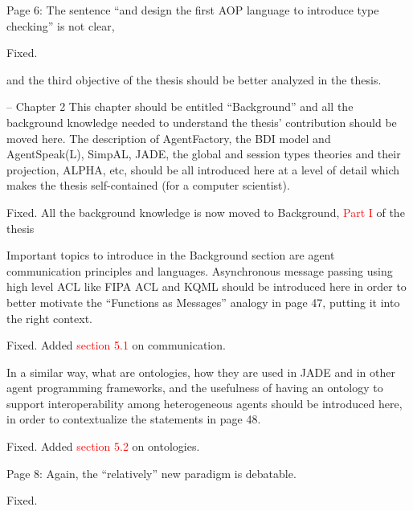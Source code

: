 \documentclass{article}
\newcommand*\R[1]{\textcolor{red}{#1}} %
\newcommand{\todo}[1]{[\textcolor{green}{TODO}: #1]}
\newenvironment{them}{\noindent\begingroup\color{blue}}{\endgroup\par}
\begin{document}
\begin{them}

Page 6:
The sentence ``and design the first AOP language to introduce type checking'' is
not clear,

\end{them}
Fixed.

\begin{them}

and the third objective of the thesis should be better analyzed in
the thesis.

\end{them}
\todo{} 

\begin{them}

-- Chapter 2
This chapter should be entitled ``Background'' and all the background knowledge
needed to understand the thesis' contribution should be moved here. The
description of AgentFactory, the BDI model and AgentSpeak(L), SimpAL, JADE, the
global and session types theories and their projection, ALPHA, etc, should be
all introduced here at a level of detail which makes the thesis self-contained
(for a computer scientist).

\end{them}
Fixed. All the background knowledge is now moved to Background, \R{Part I} of
the thesis

\begin{them}

Important topics to introduce in the Background section are agent communication
principles and languages. Asynchronous message passing using high level ACL
like FIPA ACL and KQML should be introduced here in order to better motivate
the ``Functions as Messages'' analogy in page 47, putting it into the right
context.

\end{them}
Fixed. Added \R{section 5.1} on communication.

\begin{them}

In a similar way, what are ontologies, how they are used in JADE and in other
agent programming frameworks, and the usefulness of having an ontology to
support interoperability among heterogeneous agents should be introduced here,
in order to contextualize the statements in page 48.

\end{them}
Fixed. Added \R{section 5.2} on ontologies.

\begin{them}

Page 8:
Again, the ``relatively'' new paradigm is debatable.
\end{them}
Fixed. 
\end{document}

